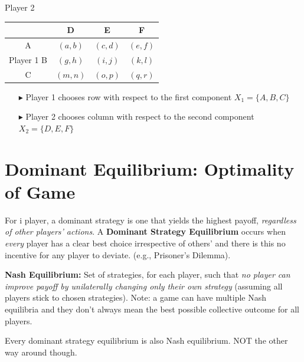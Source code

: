 \documentclass[../Main.tex]{subfiles}
\begin{document}
\begin{center}
    Player 2 \\
    \begin{tabular}{|c|c|c|c|}
        \cline{2-4}
        \multicolumn{1}{c|}{} & D & E & F \\
        \hline
        A & $(a, b)$ & $(c, d)$ & $(e, f)$ \\
        \cline{2-4}
        Player 1 \quad B & $(g, h)$ & $(i, j)$ & $(k, l)$ \\
        \cline{2-4}
        C & $(m, n)$ & $(o, p)$ & $(q, r)$ \\
        \hline
    \end{tabular}
\end{center}

\begin{itemize}
    \item[$\blacktriangleright$] Player 1 chooses row with respect to the first component
    $X_1 = \{A, B, C\}$
    \item[$\blacktriangleright$] Player 2 chooses column with respect to the second
    component $X_2 = \{D, E, F\}$
\end{itemize}

\section{Dominant Equilibrium: Optimality of Game}
For i player, a dominant strategy is one that yields the highest payoff, \textit{regardless of other players' actions}. A \textbf{Dominant Strategy Equilibrium} occurs when \textit{every} player has a clear best choice irrespective of others' and there is this no incentive for any player to deviate. (e.g., Prisoner's Dilemma). 

\textbf{Nash Equilibrium:} Set of strategies, for each player, such that \textit{no player can improve payoff by unilaterally changing only their own strategy} (assuming all players stick to chosen strategies). Note: a game can have multiple Nash equilibria and they don't always mean the best possible collective outcome for all players.

Every dominant strategy equilibrium is also Nash equilibrium. NOT the other way around though. 

\end{document}
